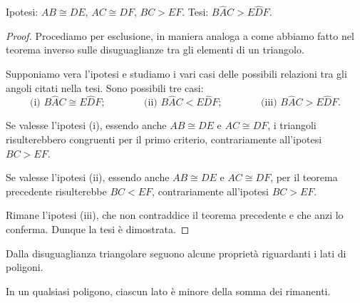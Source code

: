 \noindent Ipotesi: \(AB\cong DE\), \(AC\cong DF\), \(BC>EF\). Tesi: 
\(B\widehat{A}C>E\widehat{D}F\).


\begin{inaccessibleblock}
 \begin{figure}[htb]
\centering
\end{figure}
\end{inaccessibleblock}

\begin{proof}
Procediamo per esclusione, in maniera analoga a come abbiamo fatto 
nel teorema inverso sulle disuguaglianze tra gli elementi di un 
triangolo.

Supponiamo vera l'ipotesi e studiamo i vari casi delle possibili 
relazioni tra gli angoli citati nella tesi. Sono possibili tre casi:
\[\text{(i) }B\widehat{A}C\cong E\widehat{D}F\text{;}\qquad\qquad 
\text{(ii) }B\widehat{A}C<E\widehat{D}F\text{;}\qquad\qquad 
\text{(iii) }B\widehat{A}C>E\widehat{D}F\text{.}\]

Se valesse l'ipotesi (i), essendo anche \(AB\cong DE\) e \(AC\cong DF\), 
i triangoli risulterebbero congruenti per il primo criterio, 
contrariamente all'ipotesi \(BC>EF\).

Se valesse l'ipotesi (ii), essendo anche \(AB\cong DE\) e \(AC\cong DF\), 
per il teorema precedente risulterebbe \(BC<EF\), contrariamente 
all'ipotesi \(BC>EF\).

Rimane l'ipotesi (iii), che non contraddice il teorema precedente e 
che anzi lo conferma. Dunque la tesi è dimostrata.
\end{proof}

Dalla disuguaglianza triangolare seguono alcune proprietà riguardanti 
i lati di poligoni.

\begin{teorema}
In un qualsiasi poligono, ciascun lato è minore della somma dei 
rimanenti.
\end{teorema}

